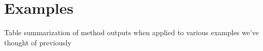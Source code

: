 \section{Examples}
\label{sec:gc:examples}

Table summarization of method outputs when applied to various examples we've thought of previously